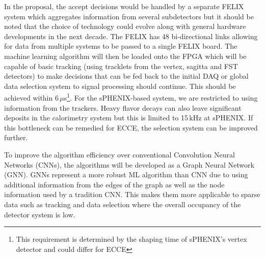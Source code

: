 In the proposal, the accept decisions would be handled by a separate FELIX system which aggregates information from several subdetectors but it should be noted that the choice of technology could evolve along with general hardware developments in the next decade. The FELIX has 48 bi-directional links allowing for data from multiple systems to be passed to a single FELIX board. The machine learning algorithm will then be loaded onto the FPGA which will be capable of basic tracking (using tracklets from the vertex, sagitta and FST detectors) to make decisions that can be fed back to the initial DAQ or global data selection system to signal processing should continue. This should be achieved within 6$\,\mu$s\footnote{This requirement is determined by the shaping time of sPHENIX's vertex detector and could differ for ECCE}. For the sPHENIX-based system, we are restricted to using information from the trackers. Heavy flavor decays can also leave significant deposits in the calorimetry system but this is limited to 15\,kHz at sPHENIX. If this bottleneck can be remedied for ECCE, the selection system can be improved further. %

%		

To improve the algorithm efficiency over conventional Convolution Neural Networks (CNNs), the algorithms will be developed as a Graph Neural Network (GNN). GNNs represent a more robust ML algorithm than CNN due to using additional information from the edges of the graph as well as the node information used by a tradition CNN. This makes them more applicable to sparse data such as tracking and data selection where the overall occupancy of the detector system is low.

